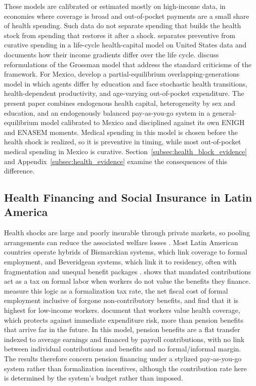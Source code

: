 \documentclass[12pt,a4paper]{article}
\begin{document}
These models are calibrated or estimated mostly on high-income data, in economies where coverage is broad and out-of-pocket payments are a small share of health spending. Such data do not separate spending that builds the health stock from spending that restores it after a shock. \citet{Ozkan2025} separates preventive from curative spending in a life-cycle health-capital model on United States data and documents how their income gradients differ over the life cycle. \citet{GalamaVanKippersluis2013} discuss reformulations of the Grossman model that address the standard criticisms of the framework. For Mexico, \citet{CortesEtAl2024} develop a partial-equilibrium overlapping-generations model in which agents differ by education and face stochastic health transitions, health-dependent productivity, and age-varying out-of-pocket expenditure. The present paper combines endogenous health capital, heterogeneity by sex and education, and an endogenously balanced pay-as-you-go system in a general-equilibrium model calibrated to Mexico and disciplined against its own ENIGH and ENASEM moments. Medical spending in this model is chosen before the health shock is realized, so it is preventive in timing, while most out-of-pocket medical spending in Mexico is curative. Section~\ref{subsec:health_block_evidence} and Appendix~\ref{subsec:health_evidence} examine the consequences of this difference.

\subsection{Health Financing and Social Insurance in Latin America}
\label{subsec:lit_health}

Health shocks are large and poorly insurable through private markets, so pooling arrangements can reduce the associated welfare losses \citep{Arrow1963}. Most Latin American countries operate hybrids of Bismarckian systems, which link coverage to formal employment, and Beveridgean systems, which link it to residency, often with fragmentation and unequal benefit packages \citep{Levy2008}. \citet{Summers1989} shows that mandated contributions act as a tax on formal labor when workers do not value the benefits they finance. \citet{WorldBankInformalizing2025} measure this logic as a formalization tax rate, the net fiscal cost of formal employment inclusive of forgone non-contributory benefits, and find that it is highest for low-income workers. \citet{BaezaPackard2006} document that workers value health coverage, which protects against immediate expenditure risk, more than pension benefits that arrive far in the future. In this model, pension benefits are a flat transfer indexed to average earnings and financed by payroll contributions, with no link between individual contributions and benefits and no formal/informal margin. The results therefore concern pension financing under a stylized pay-as-you-go system rather than formalization incentives, although the contribution rate here is determined by the system's budget rather than imposed.
\end{document}
